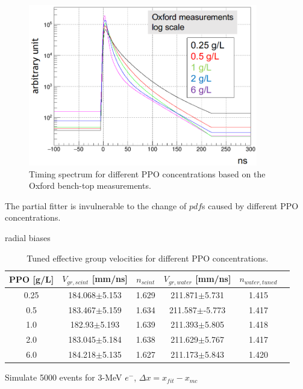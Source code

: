 \begin{figure}[!htb]
	\centering
	\includegraphics[width=10cm]{oxfordPdf_log.png}
	\caption{Timing spectrum for different PPO concentrations based on the Oxford bench-top measurements.}
	\label{oxfordPdf}
\end{figure}
The partial fitter is invulnerable to the change of $pdf$s caused by different PPO concentrations.

radial biases
\begin{table}[ht]
	\centering
	\caption{\label{partial_groupV}Tuned effective group velocities for different PPO concentrations.}	
	{\centering
		\begin{tabular*}{140mm}{c@{\extracolsep{\fill}}ccccc}
			\toprule 
			PPO [g/L] & $V_{gr,scint}$ [mm/ns]& $n_{scint}$ & $V_{gr,water}$ [mm/ns]& $n_{water,tuned}$\\
			\midrule
			0.25 & 184.068$\pm$5.153 & 1.629 & 211.871$\pm$5.731 & 1.415\\
			0.5  & 183.467$\pm$5.159 &1.634& 211.587$\pm$-5.773 & 1.417 \\
			1.0 & 182.93$\pm$5.193 &1.639& 211.393$\pm$5.805& 1.418 \\
			2.0 & 183.045$\pm$5.184& 1.638& 211.629$\pm$5.767 & 1.417	\\
			6.0 & 184.218$\pm$5.135& 1.627& 211.173$\pm$5.843 &1.420\\
			\bottomrule	
		\end{tabular*}
	}
\end{table}

Simulate 5000 events for 3-MeV $e^-$,  $\Delta x = x_{fit}-x_{mc}$


